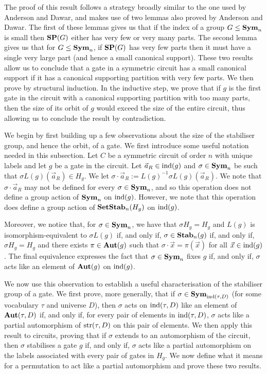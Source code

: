 \documentclass[../paper.tex]{subfiles}
\begin{document}
The proof of this result follows a strategy broadly similar to the one used by
Anderson and Dawar, and makes use of two lemmas also proved by Anderson and
Dawar. The first of these lemmas gives us that if the index of a group $G \leq
\text{\textbf{Sym}}_n$ is small then $\text{\textbf{SP}}(G)$ either has very few or very many parts. The
second lemma gives us that for $G \leq \text{\textbf{Sym}}_n$, if $\text{\textbf{SP}}(G)$ has very few parts
then it must have a single very large part (and hence a small canonical
support). These two results allow us to conclude that a gate in a symmetric
circuit has a small canonical support if it has a canonical supporting partition
with very few parts. We then prove by structural induction. In the inductive
step, we prove that if $g$ is the first gate in the circuit with a canonical
supporting partition with too many parts, then the size of its orbit of $g$
would exceed the size of the entire circuit, thus allowing us to conclude the
result by contradiction.

We begin by first building up a few observations about the size of the
stabiliser group, and hence the orbit, of a gate. We first introduce some useful
notation needed in this subsection. Let $C$ be a symmetric circuit of order $n$
with unique labels and let $g$ be a gate in the circuit. Let $\vec{a}_R \in
\text{\upshape ind}(g)$ and $\sigma \in \text{\textbf{Sym}}_n$ be such that $\sigma L(g)(\vec{a}_R) \in H_g$.
We let $\sigma \cdot \vec{a}_R := L(g)^{-1}\sigma L(g)(\vec{a}_R)$. We note that
$\sigma \cdot \vec{a}_R$ may not be defined for every $\sigma \in \text{\textbf{Sym}}_n$, and
so this operation does not define a group action of $\text{\textbf{Sym}}_n$ on $\text{\upshape ind}(g)$.
However, we note that this operation does define a group action of
$\text{\textbf{SetStab}}_n(H_g)$ on $\text{\upshape ind}(g)$.

Moreover, we notice that, for $\sigma \in \text{\textbf{Sym}}_n$, we have that $\sigma H_g =
H_g$ and $L(g)$ is isomorphism-equivalent to $\sigma L(g)$ if, and only if,
$\sigma \in \text{\textbf{Stab}}_n(g)$ if, and only if, $\sigma H_g = H_g$ and there exists
$\pi \in \text{\textbf{Aut}}(g)$ such that $\sigma \cdot \vec{x} = \pi (\vec{x})$ for all
$\vec{x} \in \text{\upshape ind}(g)$. The final equivalence expresses the fact that $\sigma \in
\text{\textbf{Sym}}_n$ fixes $g$ if, and only if, $\sigma$ acts like an element of $\text{\textbf{Aut}}(g)$ on
$\text{\upshape ind}(g)$.

We now use this observation to establish a useful characterisation of the
stabiliser group of a gate. We first prove, more generally, that if $\sigma \in
\text{\textbf{Sym}}_{\text{\upshape ind}(\tau, D)}$ (for some vocabulary $\tau$ and universe $D$), then
$\sigma$ acts on $\text{\upshape ind}(\tau, D)$ like an element of $\text{\textbf{Aut}}(\tau, D)$ if, and only
if, for every pair of elements in $\text{\upshape ind}(\tau, D)$, $\sigma$ acts like a partial
automorphism of $\text{str}(\tau, D)$ on this pair of elements. We then apply this
result to circuits, proving that if $\sigma$ extends to an automorphism of the
circuit, then $\sigma$ stabilises a gate $g$ if, and only if, $\sigma$ acts like
a partial automorphism on the labels associated with every pair of gates in
$H_g$. We now define what it means for a permutation to act like a partial
automorphism and prove these two results.
\end{document}
